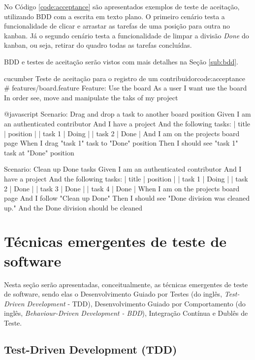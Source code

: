 No Código \ref{code:acceptance} são apresentados exemplos de teste de aceitação, utilizando BDD com a escrita em texto plano. O primeiro cenário testa a funcionalidade de clicar e arrastar as tarefas de uma posição para outra no kanban. Já o segundo cenário testa a funcionalidade de limpar a divisão \textit{Done} do kanban, ou seja, retirar do quadro todas as tarefas concluídas.

BDD e testes de aceitação serão vistos com mais detalhes na Seção \ref{sub:bdd}.

\begin{mycode}{cucumber}%
{Teste de aceitação para o registro de um contribuidor}{code:acceptance}
# features/board.feature
Feature: Use the board
  As a user
  I want use the board
  In order see, move and manipulate the taks of my project

  @javascript
  Scenario: Drag and drop a task to another board position
    Given I am an authenticated contributor
    And I have a project
    And the following tasks:
      | title  | position |
      | task 1 | Doing    |
      | task 2 | Done     |
    And I am on the projects board page
    When I drag "task 1" task to "Done" position
    Then I should see "task 1" task at "Done" position

  Scenario: Clean up Done tasks
    Given I am an authenticated contributor
    And I have a project
    And the following tasks:
      | title  | position |
      | task 1 | Doing    |
      | task 2 | Done     |
      | task 3 | Done     |
      | task 4 | Done     |
    When I am on the projects board page
    And I follow "Clean up Done"
    Then I should see "Done division was cleaned up."
    And the Done division should be cleaned
\end{mycode}


\section{Técnicas emergentes de teste de software}
\label{sec:tecnicas_emergentes_de_teste_de_software}

Nesta seção serão apresentadas, conceitualmente, as técnicas emergentes de teste de software, sendo elas o Desenvolvimento Guiado por Testes (do inglês, \textit{Test-Driven Development} - TDD), Desenvolvimento Guiado por Comportamento (do inglês, \textit{Behaviour-Driven Development - BDD}), Integração Contínua e Dublês de Teste.

\subsection{Test-Driven Development (TDD)}
\label{sub:tdd}

